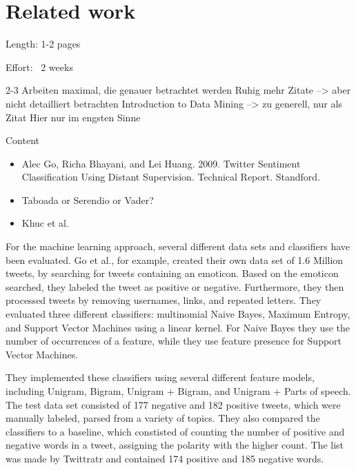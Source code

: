 \chapter{Related work}
\label{cha:Chapter2_RelatedWork}

Length: 1-2 pages

Effort: ~2 weeks

2-3 Arbeiten maximal, die genauer betrachtet werden
Ruhig mehr Zitate --> aber nicht detailliert betrachten
Introduction to Data Mining --> zu generell, nur als Zitat
Hier nur im engsten Sinne


Content
\begin{itemize}
\item Alec Go, Richa Bhayani, and Lei Huang. 2009. Twitter Sentiment Classification Using Distant Supervision.
Technical Report. Standford.
\item Taboada or Serendio or Vader?
\item Khuc et al.
\end{itemize}


For the machine learning approach, several different data sets and classifiers have been evaluated. Go et al., for example, created their own data set of 1.6 Million tweets, by searching for tweets containing an emoticon. Based on the emoticon searched, they labeled the tweet as positive or negative. Furthermore, they then processed tweets by removing usernames, links, and repeated letters. They evaluated three different classifiers: multinomial Naive Bayes, Maximum Entropy, and Support Vector Machines using a linear kernel. For Naive Bayes  they use the number of occurrences of a feature, while they use feature presence for Support Vector Machines. 

They implemented these classifiers using several different feature models, including Unigram, Bigram, Unigram + Bigram, and Unigram + Parts of speech. The test data set consisted of 177 negative and 182 positive tweets, which were manually labeled, parsed from a variety of topics. They also compared the classifiers to a baseline, which constisted of counting the number of positive and negative words in a tweet, assigning the polarity with the higher count. The list was made by Twittratr and contained 174 positive and 185 negative words. 

